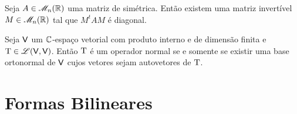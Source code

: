 \documentclass[10pt,a4paper]{book}
\begin{document}
\begin{corollary}
	Seja $A \in \mathscr{ M }_n(\mathbb{ R })$ uma matriz de simétrica. Então existem uma matriz invertível $M \in \mathscr{ M }_n(\mathbb{ R })$ tal que $M^tA M$ é diagonal.
\end{corollary}

\begin{theorem}
	Seja $\mathsf{ V }$ um $\mathbb{ C }$-espaço vetorial com produto interno e de dimensão finita e $\mathrm{ T } \in \mathscr{ L }(\mathsf{ V }, \mathsf{ V })$. Então $\mathrm{ T }$ é um operador normal se e somente se existir uma base ortonormal de $\mathsf{ V }$ cujos vetores sejam autovetores de $\mathrm{ T }$.
\end{theorem}




\chapter{Formas Bilineares}
\end{document}
